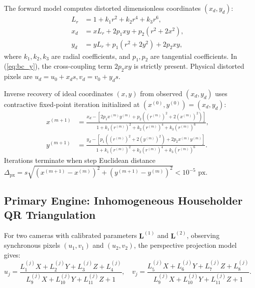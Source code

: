 \documentclass[journal]{IEEEtran}
\begin{document}
The forward model computes distorted dimensionless coordinates $(x_d, y_d)$:
\begin{align}
L_r &= 1 + k_1 r^2 + k_2 r^4 + k_3 r^6, \label{eq:radial_factor} \\
x_d &= x L_r + 2 p_1 x y + p_2 (r^2 + 2 x^2), \label{eq:bc_x} \\
y_d &= y L_r + p_1 (r^2 + 2 y^2) + 2 p_2 x y, \label{eq:bc_y}
\end{align}
where $k_1, k_2, k_3$ are radial coefficients, and $p_1, p_2$ are tangential coefficients. In (\ref{eq:bc_y}), the cross-coupling term $2p_2xy$ is strictly present. Physical distorted pixels are $u_d = u_0 + x_d s, v_d = v_0 + y_d s$.

Inverse recovery of ideal coordinates $(x, y)$ from observed $(x_d, y_d)$ uses contractive fixed-point iteration initialized at $(x^{(0)}, y^{(0)}) = (x_d, y_d)$:
\begin{align}
x^{(m+1)} &= \frac{x_d - [2 p_1 x^{(m)} y^{(m)} + p_2 ((r^{(m)})^2 + 2 (x^{(m)})^2)]}{1 + k_1 (r^{(m)})^2 + k_2 (r^{(m)})^4 + k_3 (r^{(m)})^6}, \label{eq:fp_x} \\
y^{(m+1)} &= \frac{y_d - [p_1 ((r^{(m)})^2 + 2 (y^{(m)})^2) + 2 p_2 x^{(m)} y^{(m)}]}{1 + k_1 (r^{(m)})^2 + k_2 (r^{(m)})^4 + k_3 (r^{(m)})^6}. \label{eq:fp_y}
\end{align}
Iterations terminate when step Euclidean distance $\Delta_{\mathrm{px}} = s \sqrt{(x^{(m+1)}-x^{(m)})^2 + (y^{(m+1)}-y^{(m)})^2} < 10^{-5}\text{ px}$.

\subsection{Primary Engine: Inhomogeneous Householder QR Triangulation}
For two cameras with calibrated parameters $\mathbf{L}^{(1)}$ and $\mathbf{L}^{(2)}$, observing synchronous pixels $(u_1, v_1)$ and $(u_2, v_2)$, the perspective projection model gives:
\begin{equation}
u_j = \frac{L_1^{(j)} X + L_2^{(j)} Y + L_3^{(j)} Z + L_4^{(j)}}{L_9^{(j)} X + L_{10}^{(j)} Y + L_{11}^{(j)} Z + 1}, \quad v_j = \frac{L_5^{(j)} X + L_6^{(j)} Y + L_7^{(j)} Z + L_8^{(j)}}{L_9^{(j)} X + L_{10}^{(j)} Y + L_{11}^{(j)} Z + 1}.
\end{equation}
\end{document}
